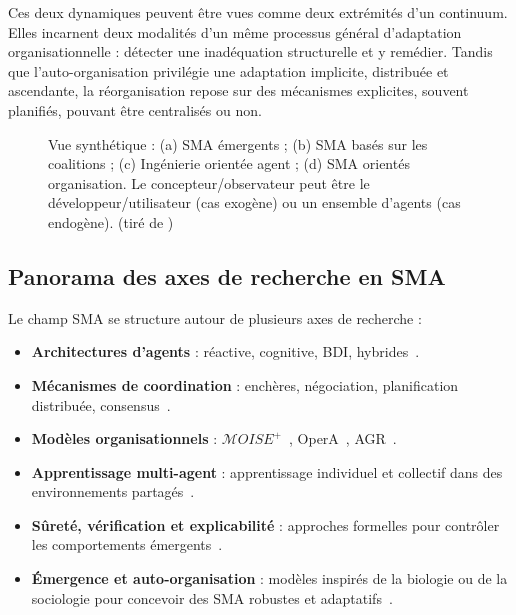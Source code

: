 Ces deux dynamiques peuvent être vues comme deux extrémités d'un continuum. Elles incarnent deux modalités d'un même processus général d'adaptation organisationnelle : détecter une inadéquation structurelle et y remédier. Tandis que l'auto-organisation privilégie une adaptation implicite, distribuée et ascendante, la réorganisation repose sur des mécanismes explicites, souvent planifiés, pouvant être centralisés ou non.

\begin{figure}[h]
    \centering
    \resizebox{\textwidth}{!}{%
        
    }
    \caption{Vue synthétique : (a) SMA émergents ; (b) SMA basés sur les coalitions ; (c) Ingénierie orientée agent ; (d) SMA orientés organisation. Le concepteur/observateur peut être le développeur/utilisateur (cas exogène) ou un ensemble d'agents (cas endogène). (tiré de \cite{Picard2009reorganisation})}
    \label{fig:auto_vs_topdown}
\end{figure}

\subsection*{Panorama des axes de recherche en \ac{SMA}}

Le champ \ac{SMA} se structure autour de plusieurs axes de recherche :

\begin{itemize}
    \item \textbf{Architectures d'agents} : réactive, cognitive, \ac{BDI}, hybrides~\cite{Georgeff1987}.
    \item \textbf{Mécanismes de coordination} : enchères, négociation, planification distribuée, consensus~\cite{Sandholm1999,Durfee2001}.
    \item \textbf{Modèles organisationnels} : $\mathcal{M}OISE^+$~\cite{hubner2002moise,Hannoun2000}, OperA~\cite{Dignum2004}, \ac{AGR}~\cite{Ferber2004}.
    \item \textbf{Apprentissage multi-agent} : apprentissage individuel et collectif dans des environnements partagés~\cite{Zhang2021}.
    \item \textbf{Sûreté, vérification et explicabilité} : approches formelles pour contrôler les comportements émergents~\cite{Boella2006}.
    \item \textbf{Émergence et auto-organisation} : modèles inspirés de la biologie ou de la sociologie pour concevoir des \ac{SMA} robustes et adaptatifs~\cite{DiMarzoSerugendo2006,Heylighen1999}.
\end{itemize}


